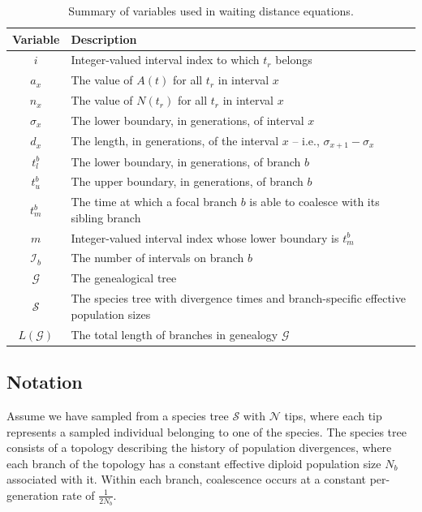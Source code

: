 \documentclass[11pt]{article}
\begin{document}
\begin{table}[h]
\centering
\caption{\label{tab:table-3} 
	Summary of variables used in waiting distance equations. 
}
\begin{tabular}[t]{ |c|l| }
	\toprule
	Variable & Description \\
	\midrule
	$i$          & Integer-valued interval index to which $t_r$ belongs      \\
	$a_x$      & The value of $A(t)$ for all $t_r$ in interval $x$   \\	
	$n_x$          & The value of $N(t_r)$ for all $t_r$ in interval $x$      \\ 
	$\sigma_x$  & The lower boundary, in generations, of interval $x$ \\
	$d_x$      & The length, in generations, of the interval $x$ -- i.e., $\sigma_{x+1} - \sigma_{x}$   \\
	$t_l^b$ & The lower boundary, in generations, of branch $b$  \\
	$t_u^b$ & The upper boundary, in generations, of branch $b$ \\
	$t_m^b$ & The time at which a focal branch $b$ is able to coalesce with its sibling branch \\
	$m$ & Integer-valued interval index whose lower boundary is $t_m^b$ \\
	$\mathcal{I}_b$          & The number of intervals on branch $b$  \\
	$\mathcal{G}$          & The genealogical tree \\
	$\mathcal{S}$   & The species tree with divergence times and branch-specific effective population sizes  \\
	$L(\mathcal{G})$ & The total length of branches in genealogy $\mathcal{G}$ \\
	\bottomrule
\end{tabular}
\end{table}


\subsection{Notation}

Assume we have sampled from a species tree $\mathcal{S}$ with $\mathcal{N}$ tips, where each tip represents a sampled individual belonging to one of the species. The species tree consists of a topology describing the history of population divergences, where each branch of the topology has a constant effective diploid population size $N_b$ associated with it. Within each branch, coalescence occurs at a constant per-generation rate of $\frac{1}{2N_b}$. 
\end{document}
